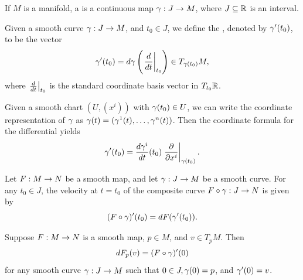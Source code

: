 \dfn If $M$ is a manifold, a  is a continuous map $\gamma:J\rightarrow M$, where $J\subseteq \mathbb{R}$ is an interval.

\dfn Given a smooth curve $\gamma:J\rightarrow M$, and $t_0\in J$, we define the , denoted by $\gamma^\prime(t_0)$, to be the vector
\[\gamma^\prime(t_0) = d\gamma\left(\left. \frac{d}{dt}\right|_{t_0}\right)\in T_{\gamma(t_0)}M,\]
where $\left. \frac{d}{dt}\right|_{t_0}$ is the standard coordinate basis vector in $T_{t_0}\mathbb{R}$.

\dfn Given a smooth chart $(U,(x^i))$ with $\gamma(t_0)\in U$, we can write the coordinate representation of $\gamma$ as $\gamma(t) = (\gamma^1(t),\ldots,\gamma^n(t))$. Then the coordinate formula for the differential yields
\[\gamma^\prime(t_0) = \frac{d\gamma^i}{dt}(t_0)\left. \frac{\partial}{\partial x^i}\right|_{\gamma(t_0)}.\]

\begin{prop}
\end{prop}

\begin{prop}
Let $F:M\rightarrow N$ be a smooth map, and let $\gamma:J\rightarrow M$ be a smooth curve. For any $t_0\in J$, the velocity at $t = t_0$ of the composite curve $F\circ \gamma:J\rightarrow N$ is given by
\[(F\circ \gamma)^\prime(t_0) = dF(\gamma^\prime(t_0)).\]
\end{prop}

\begin{cor}
Suppose $F:M\rightarrow N$ is a smooth map, $p\in M$, and $v\in T_pM$. Then 
\[dF_p(v) = (F\circ \gamma)^\prime(0)\]
for any smooth curve $\gamma:J\rightarrow M$ such that $0\in J, \gamma(0) = p$, and $\gamma^\prime(0) = v$.
\end{cor}






